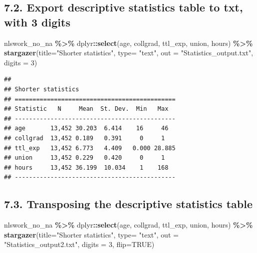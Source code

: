 \documentclass[
]{article}
\newenvironment{Shaded}{\begin{snugshade}}{\end{snugshade}}
\newcommand{\AttributeTok}[1]{\textcolor[rgb]{0.13,0.29,0.53}{#1}}
\newcommand{\ConstantTok}[1]{\textcolor[rgb]{0.56,0.35,0.01}{#1}}
\newcommand{\DecValTok}[1]{\textcolor[rgb]{0.00,0.00,0.81}{#1}}
\newcommand{\FunctionTok}[1]{\textcolor[rgb]{0.13,0.29,0.53}{\textbf{#1}}}
\newcommand{\NormalTok}[1]{#1}
\newcommand{\SpecialCharTok}[1]{\textcolor[rgb]{0.81,0.36,0.00}{\textbf{#1}}}
\newcommand{\StringTok}[1]{\textcolor[rgb]{0.31,0.60,0.02}{#1}}
\begin{document}
\hypertarget{export-descriptive-statistics-table-to-txt-with-3-digits}{%
\subsection{7.2. Export descriptive statistics table to txt, with 3
digits}\label{export-descriptive-statistics-table-to-txt-with-3-digits}}

\begin{Shaded}
\begin{Highlighting}[]
\NormalTok{nlswork\_no\_na }\SpecialCharTok{\%\textgreater{}\%}
\NormalTok{  dplyr}\SpecialCharTok{::}\FunctionTok{select}\NormalTok{(age, collgrad, ttl\_exp, union, hours) }\SpecialCharTok{\%\textgreater{}\%} 
  \FunctionTok{stargazer}\NormalTok{(}\AttributeTok{title=}\StringTok{"Shorter statistics"}\NormalTok{,}
            \AttributeTok{type=} \StringTok{"text"}\NormalTok{, }\AttributeTok{out =} \StringTok{"Statistics\_output.txt"}\NormalTok{,}
            \AttributeTok{digits =} \DecValTok{3}\NormalTok{)}
\end{Highlighting}
\end{Shaded}

\begin{verbatim}
## 
## Shorter statistics
## =============================================
## Statistic   N     Mean  St. Dev.  Min   Max  
## ---------------------------------------------
## age       13,452 30.203  6.414    16     46  
## collgrad  13,452 0.189   0.391     0     1   
## ttl_exp   13,452 6.773   4.409   0.000 28.885
## union     13,452 0.229   0.420     0     1   
## hours     13,452 36.199  10.034    1    168  
## ---------------------------------------------
\end{verbatim}

\hypertarget{transposing-the-descriptive-statistics-table}{%
\subsection{7.3. Transposing the descriptive statistics
table}\label{transposing-the-descriptive-statistics-table}}

\begin{Shaded}
\begin{Highlighting}[]
\NormalTok{nlswork\_no\_na }\SpecialCharTok{\%\textgreater{}\%}
\NormalTok{  dplyr}\SpecialCharTok{::}\FunctionTok{select}\NormalTok{(age, collgrad, ttl\_exp, union, hours) }\SpecialCharTok{\%\textgreater{}\%} 
  \FunctionTok{stargazer}\NormalTok{(}\AttributeTok{title=}\StringTok{"Shorter statistics"}\NormalTok{,}
            \AttributeTok{type=} \StringTok{"text"}\NormalTok{, }\AttributeTok{out =} \StringTok{"Statistics\_output2.txt"}\NormalTok{,}
            \AttributeTok{digits =} \DecValTok{3}\NormalTok{, }\AttributeTok{flip=}\ConstantTok{TRUE}\NormalTok{)}
\end{Highlighting}
\end{Shaded}
\end{document}
